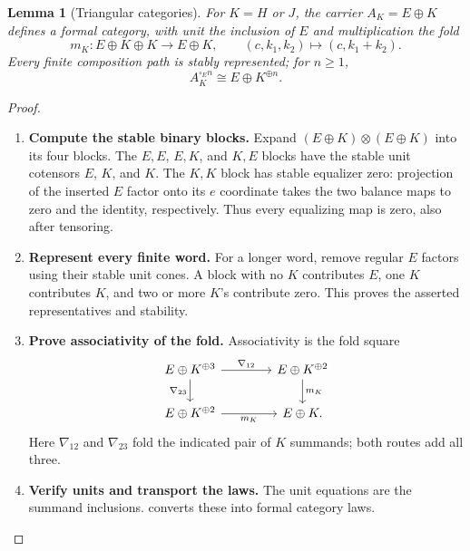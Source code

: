 \documentclass[11pt,reqno]{amsart}
\theoremstyle{plain}
\newtheorem{lemma}[theorem]{Lemma}
\theoremstyle{definition}
\theoremstyle{remark}
\numberwithin{equation}{section}
\begin{document}
\begin{lemma}[Triangular categories]\label{strong:lem:triangular}
For $K=H$ or $J$, the carrier $A_K=E\oplus K$ defines a formal category,
with unit the inclusion of $E$ and multiplication the fold
\[
m_K:E\oplus K\oplus K\longrightarrow E\oplus K,\qquad
(c,k_1,k_2)\longmapsto(c,k_1+k_2).
\]
Every finite composition path is stably represented; for $n\geq1$,
\[
A_K^{\square_E n}\cong E\oplus K^{\oplus n}.
\]
\end{lemma}
\begin{proof}\leavevmode
\begin{enumerate}
\item \textbf{Compute the stable binary blocks.} Expand $(E\oplus K)\otimes(E\oplus K)$ into its four blocks.
The $E,E$, $E,K$, and $K,E$ blocks have the stable unit cotensors
$E$, $K$, and $K$. The $K,K$ block has stable equalizer zero:
projection of the inserted $E$ factor onto its $e$ coordinate takes
the two balance maps to zero and the identity, respectively. Thus every
equalizing map is zero, also after tensoring.

\item \textbf{Represent every finite word.} For a longer word, remove regular $E$ factors using their stable unit
cones. A block with no $K$ contributes $E$, one $K$ contributes $K$,
and two or more $K$'s contribute zero. This proves the asserted
representatives and stability.

\item \textbf{Prove associativity of the fold.} Associativity is the fold square
\[
\begin{tikzcd}[column sep=4em]
E\oplus K^{\oplus3} \arrow[r,"\nabla_{12}"]
  \arrow[d,"\nabla_{23}"'] &
E\oplus K^{\oplus2} \arrow[d,"m_K"]\\
E\oplus K^{\oplus2} \arrow[r,"m_K"'] & E\oplus K.
\end{tikzcd}
\]
Here $\nabla_{12}$ and $\nabla_{23}$ fold the indicated pair of $K$
summands; both routes add all three.

\item \textbf{Verify units and transport the laws.} The unit
equations are the summand inclusions. 
converts these into formal category laws.\qedhere
\end{enumerate}
\end{proof}
\end{document}
